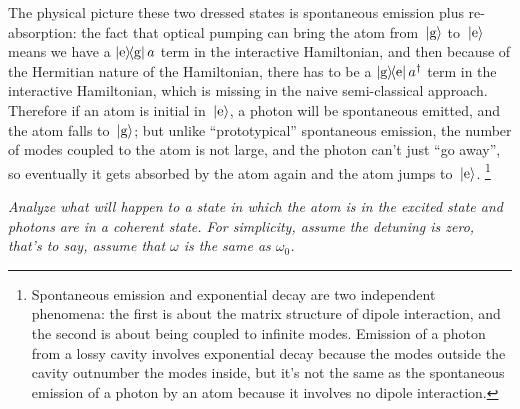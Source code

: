 \documentclass[hyperref, a4paper]{article}
\newcommand*{\kete}{\ket*{\text{e}}}
\newcommand*{\ketg}{\ket*{\text{g}}}
\newcommand*{\dyadeg}{\dyad{\text{e}}{\text{g}}}
\newcommand*{\dyadge}{\dyad{\text{g}}{\text{e}}}
\begin{document}
The physical picture these two dressed states is spontaneous emission plus re-absorption:
the fact that optical pumping can bring the atom from $\ketg$ to $\kete$ 
means we have a $\dyadeg a$ term in the interactive Hamiltonian,
and then because of the Hermitian nature of the Hamiltonian,
there has to be a $\dyadge a^\dag$ term in the interactive Hamiltonian,
which is missing in the naive semi-classical approach. 
Therefore if an atom is initial in $\kete$, 
a photon will be spontaneous emitted, and the atom falls to $\ketg$;
but unlike ``prototypical'' spontaneous emission,
the number of modes coupled to the atom is not large,
and the photon can't just ``go away'', 
so eventually it gets absorbed by the atom again and the atom jumps to $\kete$.%
\footnote{
    Spontaneous emission and exponential decay are two independent phenomena:
    the first is about the matrix structure of dipole interaction,
    and the second is about being coupled to infinite modes.
    Emission of a photon from a lossy cavity involves exponential decay 
    because the modes outside the cavity outnumber the modes inside,
    but it's not the same as the spontaneous emission of a photon by an atom 
    because it involves no dipole interaction.
}

\textit{Analyze what will happen to a state in which the atom is in the excited state  
and photons are in a coherent state.
For simplicity, assume the detuning is zero, that's to say,
assume that $\omega$ is the same as $\omega_0$.}
\end{document}
